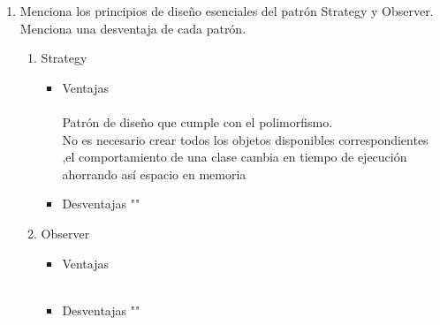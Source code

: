\documentclass[a4paper,10pt]{article}
\begin{document}
\begin{enumerate}
    
    \item Menciona los principios de diseño esenciales del patrón Strategy y Observer. Menciona una desventaja de cada patrón.
        \begin{enumerate}
            \item Strategy
            \begin{itemize}
                \item \colorbox[rgb]{0.69, 0.93, 0.93}{Ventajas}\\\\
                      Patrón de diseño que cumple con el polimorfismo.\\
                      No es necesario crear todos los objetos disponibles correspondientes ,el comportamiento de una clase cambia en tiempo
                      de ejecución ahorrando así espacio en memoria \\

                \item \colorbox[rgb]{1.0, 0.43, 0.29}{Desventajas}
                      ""      

            \end{itemize}

            \item Observer
            \begin{itemize}
                \item \colorbox[rgb]{0.69, 0.93, 0.93}{Ventajas}\\\\
                      

                \item \colorbox[rgb]{1.0, 0.43, 0.29}{Desventajas}
                      ""      

            \end{itemize}    
            
        \end{enumerate}
        
       
        
                 

\end{enumerate}
\end{document}
